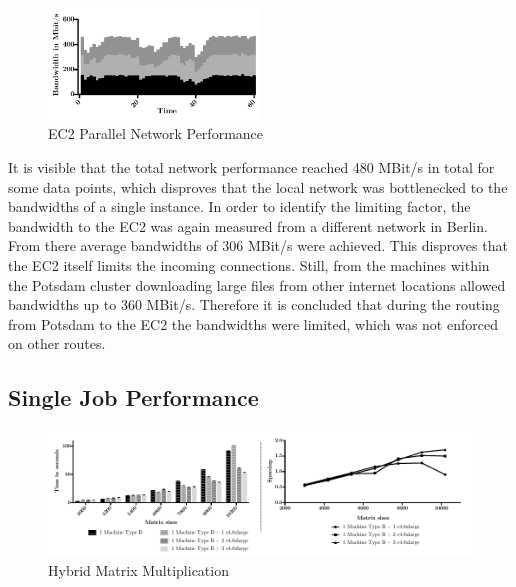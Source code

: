 \begin{figure}[!htb]
	\includegraphics[width=0.5\textwidth]{images/ec2_stacked_network_performance.pdf}
	\centering
	\caption{EC2 Parallel Network Performance}
	\label{img:EC2 Parallel Network Performance}
\end{figure}

It is visible that the total network performance reached 480 MBit/s in total for some data points, which disproves that the local network was bottlenecked to the bandwidths of a single instance. In order to identify the limiting factor, the bandwidth to the EC2 was again measured from a different network in Berlin. From there average bandwidths of 306 MBit/s were achieved. This disproves that the EC2 itself limits the incoming connections. Still, from the machines within the Potsdam cluster downloading large files from other internet locations allowed bandwidths up to 360 MBit/s. Therefore it is concluded that during the routing from Potsdam to the EC2 the bandwidths were limited, which was not enforced on other routes.

\subsection*{Single Job Performance}

\begin{figure}[H]
	\includegraphics[width=1.0\textwidth]{images/hybrid_matrix_multiplication.pdf}
	\centering
	\caption{Hybrid Matrix Multiplication}
	\label{img:hybrid_matrix_multiplication}
\end{figure}

